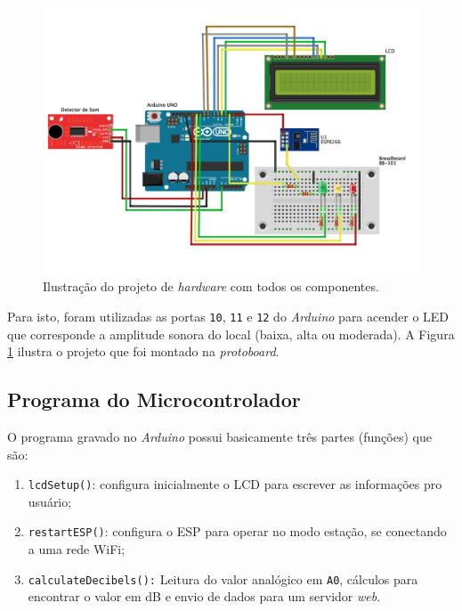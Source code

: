 \documentclass[
    12pt,               %
    openright,          %
    oneside,
    a4paper,            
    english,            %
    brazil              %
    ]{abntex2}
\begin{document}
\begin{figure}[!htb]
  \begin{center}
    \caption{\label{circ-4}Ilustração do projeto de \textit{hardware} com todos os componentes.}
    \includegraphics[scale=0.48]{images/circ-4.pdf}
  \end{center}
\end{figure}

Para isto, foram utilizadas as portas \texttt{10}, \texttt{11} e \texttt{12} do \textit{Arduino} para acender o LED que corresponde a amplitude sonora do local (baixa, alta ou moderada). A Figura \ref{circ-4} ilustra o projeto que foi montado na \textit{protoboard}. 

\subsection{Programa do Microcontrolador}

O programa gravado no \textit{Arduino} possui basicamente três partes (funções) que são:

\begin{enumerate}
   \item \texttt{lcdSetup()}: configura inicialmente o LCD para escrever as informações pro usuário;
   \item \texttt{restartESP()}: configura o ESP para operar no modo estação, se conectando a uma rede WiFi;
   \item \texttt{calculateDecibels():} Leitura do valor analógico em \texttt{A0}, cálculos para encontrar o valor em dB e envio de dados para um servidor \textit{web}.
 \end{enumerate}
\end{document}
